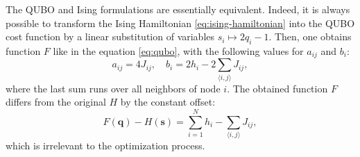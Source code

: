 The QUBO and Ising formulations are essentially equivalent. Indeed, it is
always possible to transform the Ising Hamiltonian \eqref{eq:ising-hamiltonian}
into the QUBO cost function by a linear substitution of variables $s_i \mapsto
  2q_i-1$. Then, one obtains function $F$ like in the equation
\eqref{eq:qubo}, with the following values for $a_{ij}$ and $b_{i}$:
\begin{equation}
  \label{eq:toQUBO}
  a_{ij}= 4J_{ij},
  \quad
  b_i= 2h_i - 2 \sum_{\langle i, j \rangle} J_{ij},
\end{equation}
where the last sum runs over all neighbors of node $i$. The obtained function
$F$ differs from the original $H$ by the constant offset:
\begin{equation}
  F(\mathbf{q}) - H(\mathbf{s}) =\sum_{i=1}^N h_i - \sum_{\langle i, j \rangle} J_{ij},
\end{equation}
which is irrelevant to the optimization process.

